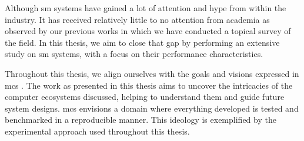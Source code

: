 Although \gls{sm} systems have gained a lot of attention and hype from within the industry. It has received relatively little to no attention from academia as observed by our previous works in which we have conducted a topical survey of the field. In this thesis, we aim to close that gap by performing an extensive study on \gls{sm} systems, with a focus on their performance characteristics.

Throughout this thesis, we align ourselves with the goals and visions expressed in \gls{mcs} \cite{iosup2018}. The work as presented in this thesis aims to uncover the intricacies of the computer ecosystems discussed, helping to understand them and guide future system designs. \gls{mcs} envisions a domain where everything developed is tested and benchmarked in a reproducible manner. This ideology is exemplified by the experimental approach used  throughout this thesis.




